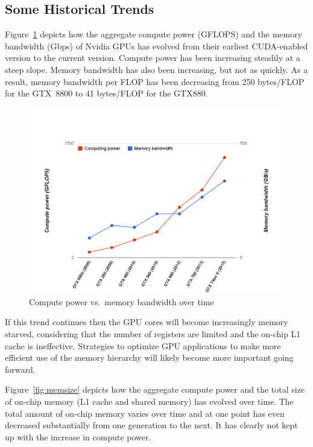 \subsection{Some Historical Trends}  \label{GPUArchTrends}

Figure~\ref{fig:compute-power} depicts how the aggregate compute power (GFLOPS) and the memory bandwidth (Gbps) of Nvidia GPUs has evolved from their earliest CUDA-enabled version to the current version.
Compute power has been increasing steadily at a steep slope.
Memory bandwidth has also been increasing, but not as quickly.
As a result, memory bandwidth per FLOP has been decreasing from 250 bytes/FLOP for the GTX~8800 to 41 bytes/FLOP for the GTX880.

\begin{figure}
\includegraphics[width=\linewidth]{computevsmemory.png}
\caption{Compute power vs.\ memory bandwidth over time 
	}
\label{fig:compute-power}
\end{figure}

If this trend continues then the GPU cores will become increasingly memory starved,
considering that the number of registers are limited and the on-chip L1 cache is ineffective.
Strategies to optimize GPU applications to make more efficient use of the memory hierarchy will likely become more important going forward.

Figure~\ref{fig:memsize} depicts how the aggregate compute power and the total size of on-chip memory (L1 cache and shared memory) has evolved over time.
The total amount of on-chip memory varies over time and at one point has even decreased substantially from one generation to the next.
It has clearly not kept up with the increase in compute power. 

